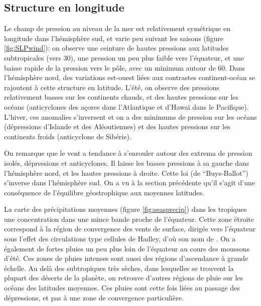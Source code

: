 \sk
\subsection{Structure en longitude}

\sk
Le champ de pression au niveau de la mer est relativement symétrique en longitude dans l'hémisphère sud, et varie peu suivant les saisons (figure \ref{fig:SLPwind}): on observe une ceinture de hautes pressions aux latitudes subtropicales (vers 30\deg), une pression un peu plus faible vers l'équateur, et une baisse rapide de la pression vers le pôle, avec un minimum autour de 60\deg. Dans l'hémisphère nord, des variations est-ouest liées aux contrastes continent-océan se rajoutent à cette structure en latitude. L'été, on observe des pressions relativement basses sur les continents chauds, et des hautes pressions sur les océans (anticyclones des açores dans l'Atlantique et d'Hawaï dans le Pacifique). L'hiver, ces anomalies s'inversent et on a des minimums de pression sur les océans (dépressions d'Islande et des Aléoutiennes) et des hautes pressions sur les continents froids (anticyclone de Sibérie).

\sk
On remarque que le vent a tendance à s'enrouler autour des extrema de pression isolés, dépressions et anticyclones. Il laisse les basses pressions à sa gauche dans l'hémisphère nord, et les hautes pressions à droite. Cette loi (de ``Buys-Ballot'') s'inverse dans l'hémisphère sud. On a vu à la section précédente qu'il s'agit d'une conséquence de l'équilibre géostrophique aux moyennes latitudes.


\sk
La carte des précipitations moyennes (figure \ref{fig:seasprecip}) dans les tropiques une concentration dans une mince bande proche de l'équateur. Cette zone étroite correspond à la région de convergence des vents de surface, dirigés vers l'équateur sous l'effet des circulations type cellules de Hadley, d'où son nom de . On a également de fortes pluies un peu plus loin de l'équateur au cours des moussons d'été. Ces zones de pluies intenses sont aussi des régions d'ascendance à grande échelle. Au delà des subtropiques très sèches, dans lesquelles se trouvent la plupart des déserts de la planète, on retrouve d'autres régions de pluie sur les océans des latitudes moyennes. Ces pluies sont cette fois liées au passage des dépressions, et pas à une zone de convergence particulière.

